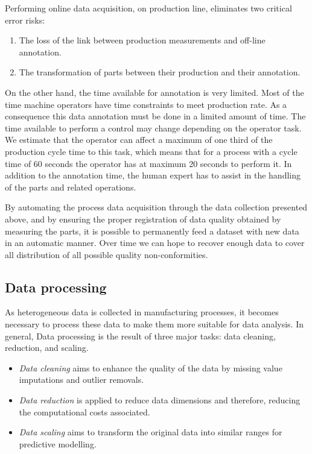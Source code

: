 Performing online data acquisition, on production line, eliminates two critical error risks:
\begin{enumerate}
    \item The loss of the link between production measurements and off-line annotation.
    \item The transformation of parts between their production and their annotation.
\end{enumerate}

On the other hand, the time available for annotation is very limited. Most of the time machine operators have time constraints to meet production rate. As a consequence this data annotation must be done in a limited amount of time. The time available  to perform a control may change depending on the operator task. We estimate that the operator can affect a maximum of one third of the production cycle time to this task, which means that for a process with a cycle time of 60 seconds the operator has at maximum 20 seconds to perform it. In addition to the annotation time, the human expert has to assist in the handling of the parts and related operations.

By automating the process data acquisition through the data collection presented above, and by ensuring the proper registration of data quality  obtained by measuring the parts, it is possible to permanently feed a dataset with new data in an automatic manner. Over time we can hope to recover enough data to cover all distribution of all possible quality non-conformities. 

\subsection{Data processing} \label{Data Processing}

As heterogeneous data is collected in manufacturing processes, it becomes necessary to process these data to make them more suitable for data analysis. In general, Data processing is the result of three major tasks: data cleaning, reduction, and scaling.

\begin{itemize}
    \item \textit{Data cleaning} aims to enhance the quality of the data by missing value imputations and outlier removals. 
    \item \textit{Data reduction} is applied to reduce data dimensions and therefore, reducing the computational costs associated. 
    \item \textit{Data scaling} aims to transform the original data into similar ranges for predictive modelling. 
\end{itemize}

